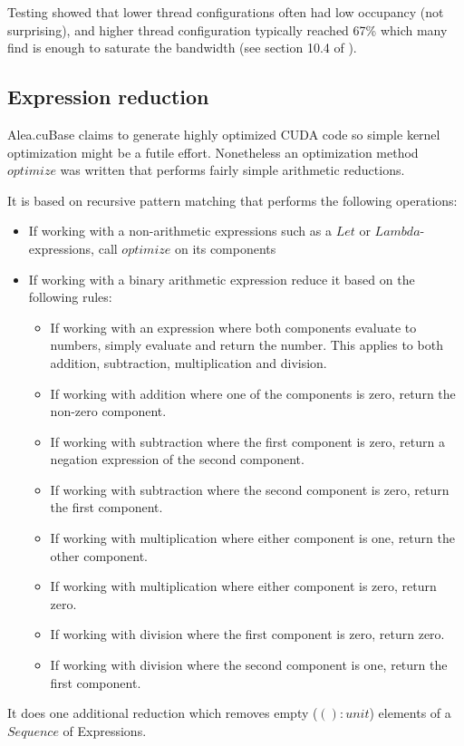 Testing showed that lower thread configurations often had low occupancy (not surprising), and higher thread configuration typically reached 67\% which many find is enough to saturate the bandwidth (see section 10.4 of \cite{cudacoccupancy}).

\subsection{Expression reduction}\label{subsec:exprReduction}
Alea.cuBase claims to generate highly optimized CUDA code so simple kernel optimization might be a futile effort.
Nonetheless an optimization method $optimize$ was written that performs fairly simple arithmetic reductions.

It is based on recursive pattern matching that performs the following operations:
\begin{itemize}
\item If working with a non-arithmetic expressions such as a $Let$ or $Lambda$-expressions, call $optimize$ on its components
\item If working with a binary arithmetic expression reduce it based on the following rules:
	\begin{itemize}
	\item If working with an expression where both components evaluate to numbers, simply evaluate and return the number. This applies to both addition, subtraction, multiplication and division.
	\item If working with addition where one of the components is zero, return the non-zero component.
	\item If working with subtraction where the first component is zero, return a negation expression of the second component.
	\item If working with subtraction where the second component is zero, return the first component.
	\item If working with multiplication where either component is one, return the other component.
	\item If working with multiplication where either component is zero, return zero.
	\item If working with division where the first component is zero, return zero.
	\item If working with division where the second component is one, return the first component.
	\end{itemize}
\end{itemize}
It does one additional reduction which removes empty ($() : unit$) elements of a $Sequence$ of Expressions.

